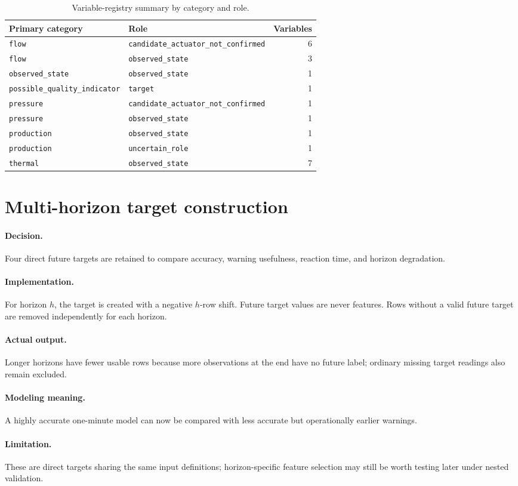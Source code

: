 \documentclass[10pt,a4paper]{article}
\newcommand{\decision}{\paragraph{Decision.}}
\newcommand{\implementation}{\paragraph{Implementation.}}
\newcommand{\actual}{\paragraph{Actual output.}}
\newcommand{\modelmeaning}{\paragraph{Modeling meaning.}}
\newcommand{\limitation}{\paragraph{Limitation.}}
\begin{document}
\begin{table}[H]
\centering
\small
\begin{tabular}{p{}p{}r}
\toprule
Primary category & Role & Variables \\
\midrule
\nolinkurl{flow} & \nolinkurl{candidate_actuator_not_confirmed} & 6 \\
\nolinkurl{flow} & \nolinkurl{observed_state} & 3 \\
\nolinkurl{observed_state} & \nolinkurl{observed_state} & 1 \\
\nolinkurl{possible_quality_indicator} & \nolinkurl{target} & 1 \\
\nolinkurl{pressure} & \nolinkurl{candidate_actuator_not_confirmed} & 1 \\
\nolinkurl{pressure} & \nolinkurl{observed_state} & 1 \\
\nolinkurl{production} & \nolinkurl{observed_state} & 1 \\
\nolinkurl{production} & \nolinkurl{uncertain_role} & 1 \\
\nolinkurl{thermal} & \nolinkurl{observed_state} & 7 \\
\bottomrule
\end{tabular}
\caption{Variable-registry summary by category and role.}
\end{table}


\section{Multi-horizon target construction}
\decision Four direct future targets are retained to compare accuracy, warning usefulness, reaction time, and horizon degradation.
\implementation For horizon $h$, the target is created with a negative $h$-row shift. Future target values are never features. Rows without a valid future target are removed independently for each horizon.
\actual Longer horizons have fewer usable rows because more observations at the end have no future label; ordinary missing target readings also remain excluded.
\modelmeaning A highly accurate one-minute model can now be compared with less accurate but operationally earlier warnings.
\limitation These are direct targets sharing the same input definitions; horizon-specific feature selection may still be worth testing later under nested validation.
\end{document}

